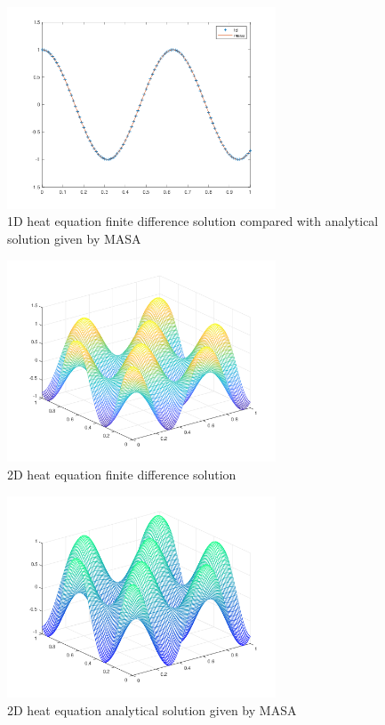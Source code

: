 \documentclass{article}
\begin{document}
\newpage
\begin{figure}[h!]
  \includegraphics[width=8cm]{figure_4}
  \caption{1D heat equation finite difference solution compared with analytical solution given by MASA}
\end{figure}

\begin{figure}[h!]
  \includegraphics[width=8cm]{figure_5}
  \caption{2D heat equation finite difference solution}
\end{figure}

\begin{figure}[h!]
  \includegraphics[width=8cm]{figure_6}
  \caption{2D heat equation analytical solution given by MASA}
\end{figure}
\end{document}

